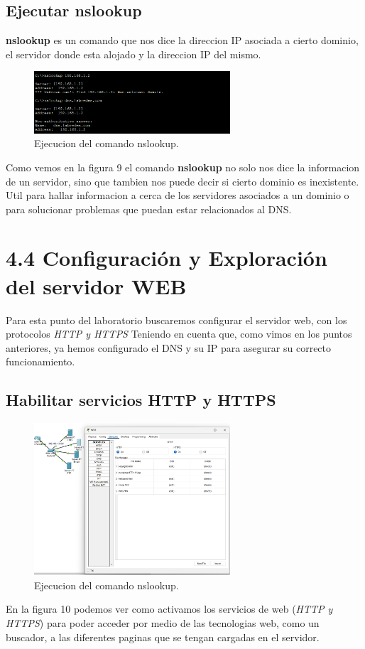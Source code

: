 \documentclass[10pt]{article}
\begin{document}
\subsection{Ejecutar nslookup}
\textbf{nslookup} es un comando que nos dice la direccion IP asociada a cierto dominio, el servidor donde esta alojado y la direccion IP del mismo. 
\begin{figure}[H]
    \centering
    \includegraphics[width=0.65\textwidth]{lab-01-screenshots/43-4-nslookup.png}
    \caption{Ejecucion del comando nslookup.}
\end{figure}
Como vemos en la figura 9 el comando \textbf{nslookup} no solo nos dice la informacion de un servidor, sino que tambien nos puede decir si cierto dominio es inexistente. Util para hallar informacion a cerca de los servidores asociados a un dominio o para solucionar problemas que puedan estar relacionados al DNS.
\section{4.4 Configuración y Exploración del servidor WEB}
Para esta punto del laboratorio buscaremos configurar el servidor web, con los protocolos \textit{HTTP y HTTPS} Teniendo en cuenta que, como vimos en los puntos anteriores, ya hemos configurado el DNS y su IP para asegurar su correcto funcionamiento.
\subsection{Habilitar servicios HTTP y HTTPS}
\begin{figure}[H]
    \centering
    \includegraphics[width=0.65\textwidth]{lab-01-screenshots/44-1-config-server.png}
    \caption{Ejecucion del comando nslookup.}
\end{figure}
En la figura 10 podemos ver como activamos los servicios de web (\textit{HTTP y HTTPS}) para poder acceder por medio de las tecnologias web, como un buscador, a las diferentes paginas que se tengan cargadas en el servidor.
\end{document}
